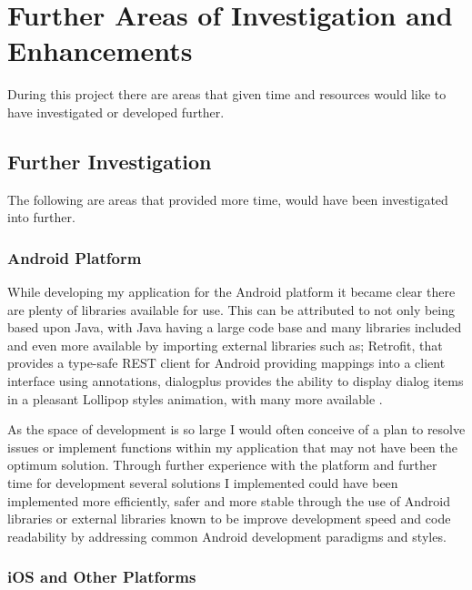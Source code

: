 \section{Further Areas of Investigation and
Enhancements}\label{further-areas-of-investigation-and-enhancements}

During this project there are areas that given time and resources would
like to have investigated or developed further.

\subsection{Further Investigation}\label{further-investigation}

The following are areas that provided more time, would have been
investigated into further.

\subsubsection{Android Platform}\label{android-platform}

While developing my application for the Android platform it became clear
there are plenty of libraries available for use. This can be attributed
to not only being based upon Java, with Java having a large code base
and many libraries included and even more available by importing
external libraries such as; Retrofit, that provides a type-safe REST
client for Android providing mappings into a client interface using
annotations, dialogplus provides the ability to display dialog items in
a pleasant Lollipop styles animation, with many more available
\parencite{androidlibs}.

As the space of development is so large I would often conceive of a plan
to resolve issues or implement functions within my application that may
not have been the optimum solution. Through further experience with the
platform and further time for development several solutions I
implemented could have been implemented more efficiently, safer and more
stable through the use of Android libraries or external libraries known
to be improve development speed and code readability by addressing
common Android development paradigms and styles.

\subsubsection{iOS and Other Platforms}\label{ios-and-other-platforms}

